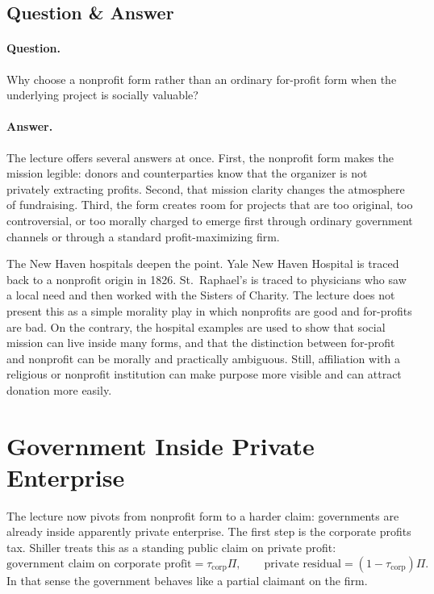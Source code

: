 \subsection{Question \& Answer}

\paragraph{Question.} Why choose a nonprofit form rather than an ordinary for-profit form when the underlying project is socially valuable?

\paragraph{Answer.} The lecture offers several answers at once. First, the nonprofit form makes the mission legible: donors and counterparties know that the organizer is not privately extracting profits. Second, that mission clarity changes the atmosphere of fundraising. Third, the form creates room for projects that are too original, too controversial, or too morally charged to emerge first through ordinary government channels or through a standard profit-maximizing firm.

The New Haven hospitals deepen the point. Yale New Haven Hospital is traced back to a nonprofit origin in 1826. St.\ Raphael's is traced to physicians who saw a local need and then worked with the Sisters of Charity. The lecture does not present this as a simple morality play in which nonprofits are good and for-profits are bad. On the contrary, the hospital examples are used to show that social mission can live inside many forms, and that the distinction between for-profit and nonprofit can be morally and practically ambiguous. Still, affiliation with a religious or nonprofit institution can make purpose more visible and can attract donation more easily.

\section{Government Inside Private Enterprise}

The lecture now pivots from nonprofit form to a harder claim: governments are already inside apparently private enterprise. The first step is the corporate profits tax. Shiller treats this as a standing public claim on private profit:
\begin{equation}
\text{government claim on corporate profit}=\tau_{\text{corp}}\Pi,
\qquad
\text{private residual}=(1-\tau_{\text{corp}})\Pi.
\end{equation}
In that sense the government behaves like a partial claimant on the firm.

